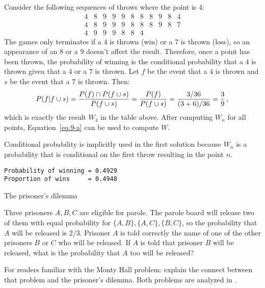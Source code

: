
\newpage


 Consider the following sequences of throws where the point is $4$:
\[
\begin{array}{rrrrrrrrrrr}
4 & 8 & 9 & 9 & 9 & 8 & 8 & 8 & 9 & 8 & 4\\
4 & 8 & 9 & 9 & 9 & 8 & 8 & 8 & 9 & 8 & 7\\
4 & 9 & 9 & 9 & 8 & 8 & 4
\end{array}
\]
The games only terminates if a $4$ is thrown (win) or a $7$ is thrown (loss), so an appearance of an $8$ or a $9$ doesn't affect the result. Therefore, once a point has been thrown, the probability of winning is the conditional probability that a $4$ is thrown given that a $4$ or  a $7$ is thrown. Let $f$ be the event that a $4$ is thrown and $s$ be the event that a $7$ is thrown. Then:
\[
P(f|f\cup s) = \displaystyle\frac{P(f)\cap P(f\cup s)}{P(f\cup s)}=\displaystyle\frac{P(f)}{P(f\cup s)}=\displaystyle\frac{3/36}{(3+6)/36}=\displaystyle\frac{3}{9}\,,
\]
which is exactly the result $W_4$ in the table above. After computing $W_n$ for all points, Equation~\ref{eq.9-a} can be used to compute $W$.

Conditional probability is implicitly used in the first solution because $W_n$ is a probability that is conditional on the first throw resulting in the point $n$.

\sml{}
\begin{verbatim}
Probability of winning = 0.4929
Proportion of wins     = 0.4948
\end{verbatim}








\begin{prob}{The prisoner's dilemma}

Three prisoners $A,B,C$ are eligible for parole. The parole board will release two of them with equal probability for $\{A,B\}, \{A,C\}, \{B,C\}$, so the probability that $A$ will be released is $2/3$. Prisoner $A$ is told correctly the name of  one of the other prisoners $B$ or $C$ who will be released. If $A$ is told that prisoner $B$ will be released, what is the probability that $A$ too will be released?

For readers familiar with the Monty Hall problem: explain the connect between that problem and the prisoner's dilemma. Both problems are analyzed in \cite{carlton}.

\end{prob}


